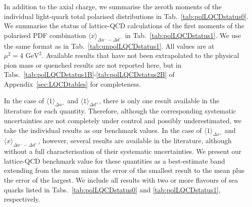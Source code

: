 In addition to the axial charge, we summarise the zeroth moments of the 
individual light-quark total polarised distributions in 
Tab.~\ref{tab:polLQCDstatus0}. 
%
We summarise the status of lattice-QCD calculations of the
first moments of the polarised PDF combination 
$\langle x \rangle_{\Delta u^- - \Delta d^-}$ in Tab.~\ref{tab:polLQCDstatus1}. 
%
We use the same format as in Tab.~\ref{tab:unpolLQCDstatus1}.
%
All values are at $\mu^2=4\mbox{ GeV}^2$.
%
Available results that have not been extrapolated to the physical pion mass
or quenched results are not reported here, but in 
Tabs.~\ref{tab:polLQCDstatus1B}-\ref{tab:polLQCDstatus2B} of
Appendix~\ref{sec:LQCDtables} for completeness.

In the case of $\langle 1 \rangle_{\Delta u^+}$ and $\langle 1 \rangle_{\Delta d^+}$,
there is only one result available in the literature for each quantity.
%
Therefore, although the corresponding systematic uncertainties are not 
completely under control and possibly underestimated, we take the individual 
results as our benchmark values.
%
In the case of $\langle 1 \rangle_{\Delta s^+}$ and 
$\langle x \rangle_{\Delta u^- - \Delta d^-}$, however, several results are available
in the literature, although without a full characterisation of
their systematic uncertainties.
%
We present our lattice-QCD benchmark value for these quantities as
a best-estimate band extending from the mean minus the error of the 
smallest result to the mean plus the error of the largest. 
%
We include all results with two or more flavours of sea quarks listed in 
Tabs.~\ref{tab:polLQCDstatus0} and \ref{tab:polLQCDstatus1}, respectively.

